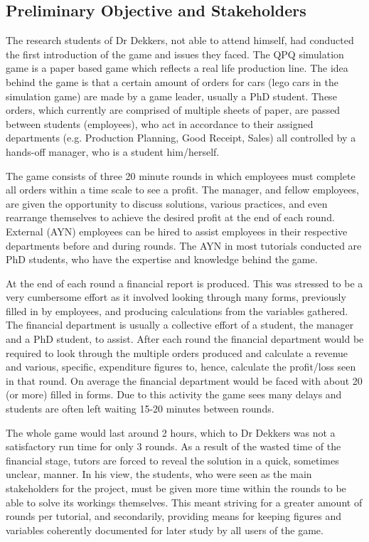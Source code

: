 \documentclass{l3proj}
\begin{document}
\subsection{Preliminary Objective and Stakeholders}
The research students of Dr Dekkers, not able to attend himself, had conducted the first introduction of the game and issues they faced. The QPQ simulation game is a paper based game which reflects a real life production line. The idea behind the game is that a certain amount of orders for cars (lego cars in the simulation game) are made by a game leader, usually a PhD student. These orders, which currently are comprised of multiple sheets of paper, are passed between students (employees), who act in accordance to their assigned departments (e.g. Production Planning, Good Receipt, Sales) all controlled by a hands-off manager, who is a student him/herself. 

The game consists of three 20 minute rounds in which employees must complete all orders within a time scale to see a profit. The manager, and fellow employees, are given the opportunity to discuss solutions, various practices, and even rearrange themselves to achieve the desired profit at the end of each round. External (AYN) employees can be hired to assist employees in their respective departments before and during rounds. The AYN in most tutorials conducted are PhD students, who have the expertise and knowledge behind the game.

At the end of each round a financial report is produced. This was stressed to be a very cumbersome effort as it involved looking through many forms, previously filled in by employees, and producing calculations from the variables gathered. The financial department is usually a collective effort of a student, the manager and a PhD student, to assist. After each round the financial department would be required to look through the multiple orders produced and calculate a revenue and various, specific, expenditure figures to, hence, calculate the profit/loss seen in that round. On average the financial department would be faced with about 20 (or more) filled in forms. Due to this activity the game sees many delays and students are often left waiting 15-20 minutes between rounds.

The whole game would last around 2 hours, which to Dr Dekkers was not a satisfactory run time for only 3 rounds. As a result of the wasted time of the financial stage, tutors are forced to reveal the solution in a quick, sometimes unclear, manner. In his view, the students, who were seen as the main stakeholders for the project, must be given more time within the rounds to be able to solve its workings themselves. This meant striving for a greater amount of rounds per tutorial, and secondarily, providing means for keeping figures and variables coherently documented for later study by all users of the game.
\end{document}
